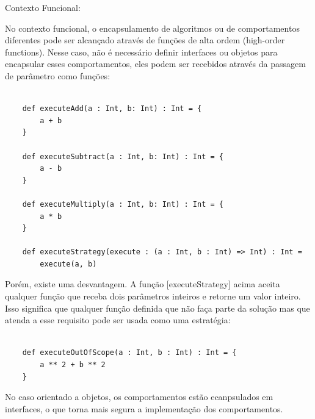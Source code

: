 Contexto Funcional:

No contexto funcional, o encapsulamento de algoritmos 
ou de comportamentos diferentes pode ser alcançado através 
de funções de alta ordem (high-order functions). Nesse caso,
 não é necessário definir interfaces ou objetos para encapsular 
 esses comportamentos, eles podem ser recebidos através da 
 passagem de parâmetro como funções:


\begin{lstlisting}[caption={Strategy Funcional},label=fpstrategy]
    
    def executeAdd(a : Int, b: Int) : Int = {
        a + b
    }

    def executeSubtract(a : Int, b: Int) : Int = {
        a - b
    }

    def executeMultiply(a : Int, b: Int) : Int = {
        a * b
    }

    def executeStrategy(execute : (a : Int, b : Int) => Int) : Int =
        execute(a, b)

\end{lstlisting}

Porém, existe uma desvantagem. A função [executeStrategy] 
acima aceita qualquer função que receba dois parâmetros 
inteiros e retorne um valor inteiro. Isso significa que 
qualquer função definida que não faça parte da solução 
mas que atenda a esse requisito pode ser usada como uma
 estratégia:

 \begin{lstlisting}[caption={Strategy Funcional: Problema},label=fpstrategyproblem]
    
    def executeOutOfScope(a : Int, b : Int) : Int = {
        a ** 2 + b ** 2
    }

\end{lstlisting}

No caso orientado a objetos, os comportamentos estão 
ecanpsulados em interfaces, o que torna mais segura a 
implementação dos comportamentos.